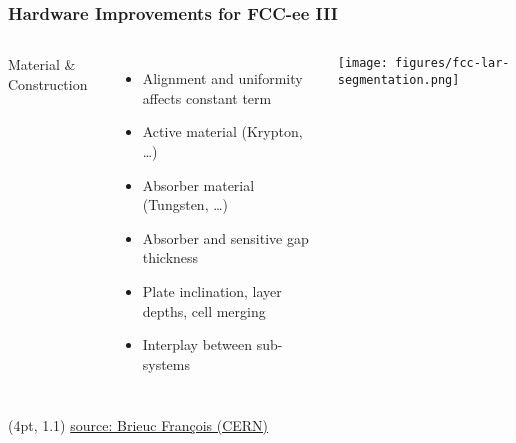 \documentclass[aspectratio=169]{beamer}
\newcommand{\bluetext}[1]{%
  \textcolor{myBlue}{#1}
}
\begin{document}
\begin{frame}
  \frametitle{Hardware Improvements for FCC-ee III}

  \begin{columns}[c]

    \bluetext{Material \& Construction}
    \begin{itemize}
      \item Alignment and uniformity affects constant term
      \item Active material (Krypton, \dots)
      \item Absorber material (Tungsten, \dots)
      \item Absorber and sensitive gap thickness
      \item Plate inclination, layer depths, cell merging
      \item Interplay between sub-systems
    \end{itemize}


    \begin{center}
      \texttt{[image: figures/fcc-lar-segmentation.png]}
    \end{center}
  \end{columns}

  \begin{textblock*}{\paperwidth}(4pt, 1.1\textheight)
    {\tiny
     \href{https://indico.cern.ch/event/999820/contributions/4200638/attachments/2241010/3799623/ECFA_TF6_NobleLiquid_Brieuc_Francois.pdf}
          {source: Brieuc François (CERN)}}
  \end{textblock*}
\end{frame}
\end{document}
